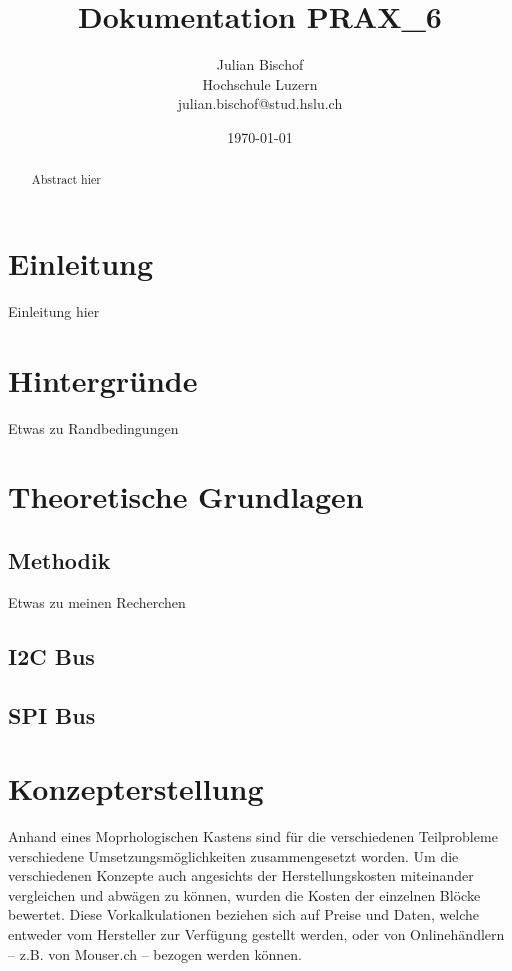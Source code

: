\documentclass[]{article}
\title{Dokumentation PRAX\_6}
\author{Julian Bischof \\
        Hochschule Luzern \\
        julian.bischof@stud.hslu.ch}
\date{\today}
\begin{document}

\maketitle 
\thispagestyle{empty}

\newpage
\thispagestyle{empty}
\begin{abstract}
    Abstract hier
\end{abstract}
\newpage

\tableofcontents %
\listoffigures %
\listoftables %
\clearpage
\setcounter{page}{0}

\section{Einleitung}

Einleitung hier

\section{Hintergründe}

Etwas zu Randbedingungen

\section{Theoretische Grundlagen}
\subsection{Methodik}
Etwas zu meinen Recherchen
\subsection{I2C Bus}
\subsection{SPI Bus}

\section{Konzepterstellung}
Anhand eines Moprhologischen Kastens sind für die verschiedenen Teilprobleme verschiedene Umsetzungsmöglichkeiten
zusammengesetzt worden. Um die verschiedenen Konzepte auch angesichts der Herstellungskosten miteinander vergleichen und abwägen 
zu können, wurden die Kosten der einzelnen Blöcke bewertet. Diese Vorkalkulationen beziehen sich auf Preise und Daten, welche entweder vom 
Hersteller zur Verfügung gestellt werden, oder von Onlinehändlern -- z.B. von Mouser.ch -- bezogen werden können.
\end{document}
